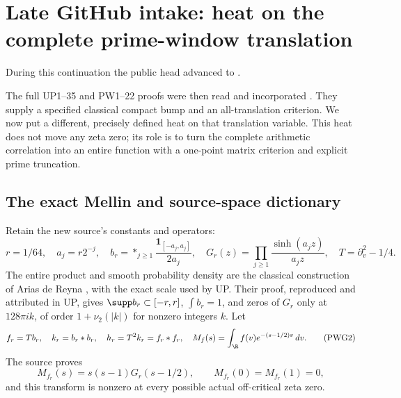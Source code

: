 \section{Late GitHub intake: heat on the complete prime-window translation}
During this continuation the public head advanced to
.\par
The full UP1--35 and PW1--22 proofs were then read and incorporated \cite{UP,PW}. They supply a specified classical compact bump and an all-translation criterion. We now put a different, precisely defined heat on that translation variable. This heat does not move any zeta zero; its role is to turn the complete arithmetic correlation into an entire function with a one-point matrix criterion and explicit prime truncation.

\subsection{The exact Mellin and source-space dictionary}
Retain the new source's constants and operators:
\begin{equation}
 r=1/64,\quad a_j=r2^{-j},\quad
 b_r=\mathop{*}_{j\ge1}\frac{\mathbf1_{[-a_j,a_j]}}{2a_j},\quad
 G_r(z)=\prod_{j\ge1}\frac{\sinh(a_jz)}{a_jz},\quad
 T=\partial_v^2-1/4.                                        \tag{PWG1}\label{PWG1}
\end{equation}
The entire product and smooth probability density are the classical construction of Arias de Reyna \cite{Arias}, with the exact scale used by UP. Their proof, reproduced and attributed in UP, gives
$\supp b_r\subset[-r,r]$, $\int b_r=1$, and zeros of $G_r$ only at
$128\pi i k$, of order $1+\nu_2(|k|)$ for nonzero integers $k$.
Let
\begin{equation}
 f_r=Tb_r,\quad k_r=b_r*b_r,\quad h_r=T^2k_r=f_r*f_r,
 \quad M_f(s)=\int_\R f(v)e^{-(s-1/2)v}\,dv.                 \tag{PWG2}\label{PWG2}
\end{equation}
The source proves
\begin{equation}
 M_{f_r}(s)=s(s-1)G_r(s-1/2),\qquad
 M_{f_r}(0)=M_{f_r}(1)=0,                                   \tag{PWG3}\label{PWG3}
\end{equation}
and this transform is nonzero at every possible actual off-critical zeta zero.

